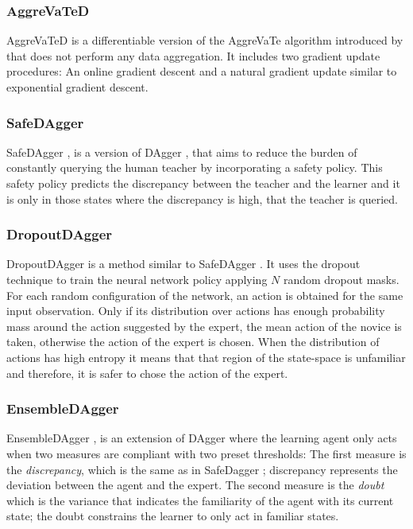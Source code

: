 \subsubsection*{AggreVaTeD}
AggreVaTeD \cite{AggreVaTeD-Sun:2017} is a differentiable version of the AggreVaTe algorithm introduced by \cite{AggreVaTe-Ross-Bagnell:2014} that does not perform any data aggregation. It includes two gradient update procedures: An online gradient descent and a natural gradient update similar to exponential gradient descent.

\subsubsection*{SafeDAgger}
SafeDAgger \cite{SafeDAgger-Zhang-Cho:2016}, is a version of DAgger \cite{DAgger-Ross:2011}, that aims to reduce the burden of constantly querying the human teacher by incorporating a safety policy. This safety policy predicts the discrepancy between the teacher and the learner and it is only in those states where the discrepancy is high, that the teacher is queried.


\subsubsection*{DropoutDAgger}
DropoutDAgger \cite{DropoutDAgger} is a method similar to SafeDAgger \cite{SafeDAgger-Zhang-Cho:2016}. It uses the dropout technique to train the neural network policy applying $N$ random dropout masks. For each random configuration of the network, an action is obtained for the same input observation. Only if its distribution over actions has enough probability mass around the action suggested by the expert, the mean action of the novice is taken, otherwise the action of the expert is chosen. When the distribution of actions has high entropy it means that that region of the state-space is unfamiliar and therefore, it is safer to chose the action of the expert.

\subsubsection*{EnsembleDAgger}
EnsembleDAgger \cite{EnsembleDAgger-Menda:2019}, is an extension of DAgger where the learning agent only acts when two measures are compliant with two preset thresholds: The first measure is the \textit{discrepancy}, which is the same as in SafeDagger \cite{SafeDAgger-Zhang-Cho:2016}; discrepancy represents the deviation between the agent and the expert. The second measure is the \textit{doubt} which is the variance that indicates the familiarity of the agent with its current state; the doubt constrains the learner to only act in familiar states. 

